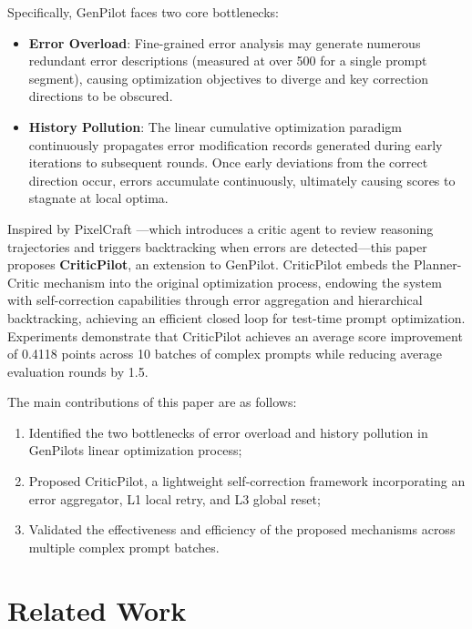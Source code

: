 \documentclass[UTF8]{article} %
\begin{document}
Specifically, GenPilot faces two core bottlenecks:

\begin{itemize}
\item
  \textbf{Error Overload}: Fine-grained error analysis may generate
  numerous redundant error descriptions (measured at over 500 for a
  single prompt segment), causing optimization objectives to diverge and
  key correction directions to be obscured.
\item
  \textbf{History Pollution}: The linear cumulative optimization
  paradigm continuously propagates error modification records generated
  during early iterations to subsequent rounds. Once early deviations
  from the correct direction occur, errors accumulate continuously,
  ultimately causing scores to stagnate at local optima.
\end{itemize}

Inspired by PixelCraft \cite{zhang2025pixelcraftmultiagenthighfidelityvisual}---which introduces a critic agent to
review reasoning trajectories and triggers backtracking when errors are
detected---this paper proposes \textbf{CriticPilot}, an extension to
GenPilot. CriticPilot embeds the Planner-Critic mechanism into the
original optimization process, endowing the system with self-correction
capabilities through error aggregation and hierarchical backtracking,
achieving an efficient closed loop for test-time prompt optimization.
Experiments demonstrate that CriticPilot achieves an average score
improvement of 0.4118 points across 10 batches of complex prompts while
reducing average evaluation rounds by 1.5.

The main contributions of this paper are as follows:

\begin{enumerate}
\def\labelenumi{\arabic{enumi}.}
\item
  Identified the two bottlenecks of error overload and history pollution
  in GenPilot\textquotesingle s linear optimization process;
\item
  Proposed CriticPilot, a lightweight self-correction framework
  incorporating an error aggregator, L1 local retry, and L3 global
  reset;
\item
  Validated the effectiveness and efficiency of the proposed mechanisms
  across multiple complex prompt batches.
\end{enumerate}

\section{Related Work}\label{related-work}
\end{document}
